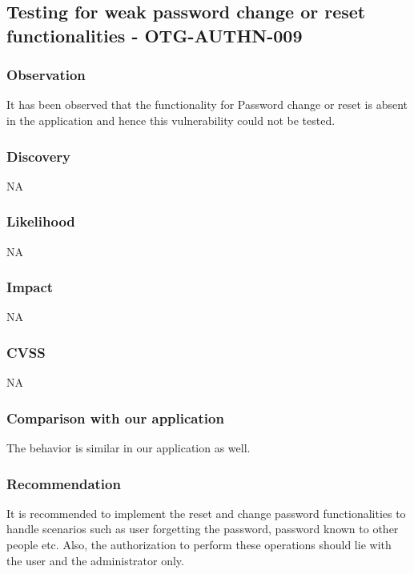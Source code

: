 \subsection{Testing for weak password change or reset functionalities - OTG-AUTHN-009}

\subsubsection{Observation}
It has been observed that the functionality for Password change or reset is absent in the application and hence this vulnerability could not be tested.

\subsubsection{Discovery}
NA

\subsubsection{Likelihood}
NA

\subsubsection{Impact}
NA

\subsubsection{CVSS}
NA

\subsubsection{Comparison with our application}
The behavior is similar in our application as well.

\subsubsection{Recommendation}
It is recommended to implement the reset and change password functionalities to handle scenarios such as user forgetting the password, password known to other people etc. Also, the authorization to perform these operations should lie with the user and the administrator only. 
\clearpage